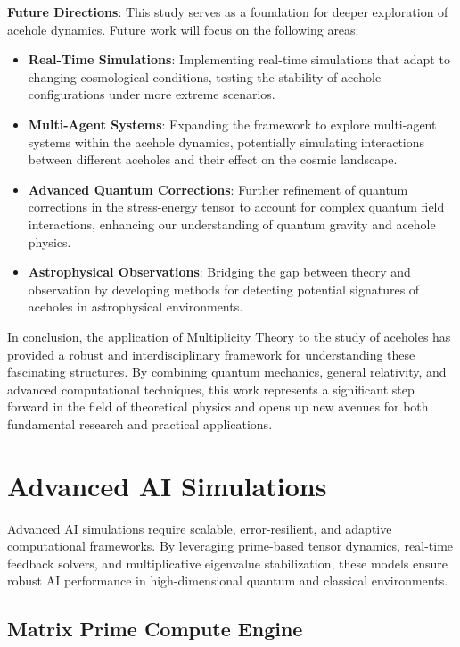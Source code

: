 \documentclass{article}
\theoremstyle{plain}
\begin{document}
\begin{itemize}
\begin{itemize}
\textbf{Future Directions}: This study serves as a foundation for deeper exploration of acehole dynamics. Future work will focus on the following areas:
\begin{itemize}
    \item \textbf{Real-Time Simulations}: Implementing real-time simulations that adapt to changing cosmological conditions, testing the stability of acehole configurations under more extreme scenarios.
    \item \textbf{Multi-Agent Systems}: Expanding the framework to explore multi-agent systems within the acehole dynamics, potentially simulating interactions between different aceholes and their effect on the cosmic landscape.
    \item \textbf{Advanced Quantum Corrections}: Further refinement of quantum corrections in the stress-energy tensor to account for complex quantum field interactions, enhancing our understanding of quantum gravity and acehole physics.
    \item \textbf{Astrophysical Observations}: Bridging the gap between theory and observation by developing methods for detecting potential signatures of aceholes in astrophysical environments.
\end{itemize}

In conclusion, the application of Multiplicity Theory to the study of aceholes has provided a robust and interdisciplinary framework for understanding these fascinating structures. By combining quantum mechanics, general relativity, and advanced computational techniques, this work represents a significant step forward in the field of theoretical physics and opens up new avenues for both fundamental research and practical applications.

\section{Advanced AI Simulations}

Advanced AI simulations require scalable, error-resilient, and adaptive computational frameworks. By leveraging prime-based tensor dynamics, real-time feedback solvers, and multiplicative eigenvalue stabilization, these models ensure robust AI performance in high-dimensional quantum and classical environments.

\subsection{Matrix Prime Compute Engine}


\end{itemize}
\end{itemize}
\end{document}

